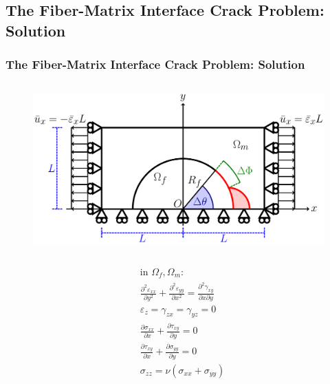 \documentclass[first,firstsupp,lastsupp,last,hyperref,table]{ETHclass}
\begin{document}
\subsection[Solution]{The Fiber-Matrix Interface Crack Problem: Solution}

\begin{frame}
\frametitle{\vspace{0.4cm}\small The Fiber-Matrix Interface Crack Problem: Solution}
\vspace{-1.cm}
\centering
\begin{columns}
\begin{column}{0.6\textwidth}
\begin{figure}
\includegraphics[width=0.95\columnwidth]{RUC.pdf}
\end{figure}
\vspace{-0.75cm}
\begin{columns}
\begin{column}{0.4\columnwidth}
\tiny
\begin{equation*}
\begin{aligned}
&\text{in }\Omega_{f}, \Omega_{m}:\\
&\frac{\partial^{2}\varepsilon_{xx}}{\partial y^{2}}+\frac{\partial^{2}\varepsilon_{yy}}{\partial x^{2}}=\frac{\partial^{2}\gamma_{xy}}{\partial x\partial y}\\
&\varepsilon_{z}=\gamma_{zx}=\gamma_{yz}=0\\
&\frac{\partial\sigma_{xx}}{\partial x}+\frac{\partial\tau_{xy}}{\partial y} = 0\\
&\frac{\partial\tau_{xy}}{\partial x}+\frac{\partial\sigma_{yy}}{\partial y} = 0\\
&\sigma_{zz}=\nu\left(\sigma_{xx}+\sigma_{yy}\right)\\
\end{aligned}
\end{equation*}
\end{column}

\end{columns}
\end{column}
\end{columns}
\end{frame}
\end{document}

